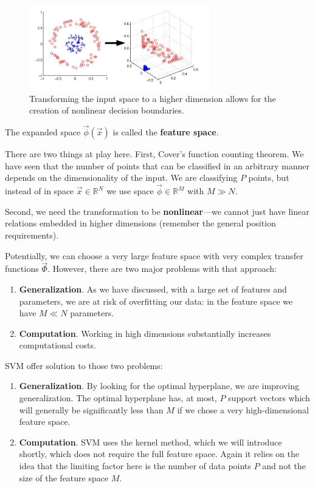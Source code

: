 \documentclass[11pt]{book} %
\begin{document}
\begin{figure}[ht]
    \centering
    \includegraphics[width=0.7\textwidth]{./Figs/ellipse_kernel_trick.png}
    \caption{Transforming the input space to a higher dimension allows for the creation of nonlinear decision boundaries.}
    \label{fig:kernel_method}
\end{figure}


The expanded space $\vec{\phi}(\vec{x})$ is called the \textbf{feature space}.

There are two things at play here. First, Cover's function counting theorem. We have seen that the number of points that can be classified in an arbitrary manner depends on the dimensionality of the input. We are classifying $P$ points, but instead of in space $\vec{x} \in \mathbb{R}^N$ we use space $\vec{\phi} \in \mathbb{R}^M$ with $M \gg N$.

Second, we need the transformation to be \textbf{nonlinear}---we cannot just have linear relations embedded in higher dimensions (remember the general position requirements).

Potentially, we can choose a very large feature space with very complex transfer functions $\vec{\Phi}$. However, there are two major problems with that approach:

\begin{enumerate}
    \item \textbf{Generalization}. As we have discussed, with a large set of features and parameters, we are at risk of overfitting our data: in the feature space we have $M \ll N$ parameters.
    \item \textbf{Computation}. Working in high dimensions substantially increases computational costs.
\end{enumerate}

SVM offer solution to those two problems:

\begin{enumerate}
    \item \textbf{Generalization}. By looking for the optimal hyperplane, we are improving generalization. The optimal hyperplane has, at most, $P$ support vectors which will generally be significantly less than $M$ if we chose a very high-dimensional feature space.
    \item \textbf{Computation}. SVM uses the kernel method, which we will introduce shortly, which does not require the full feature space. Again it relies on the idea that the limiting factor here is the number of data points $P$ and not the size of the feature space $M$.
\end{enumerate}
\end{document}
